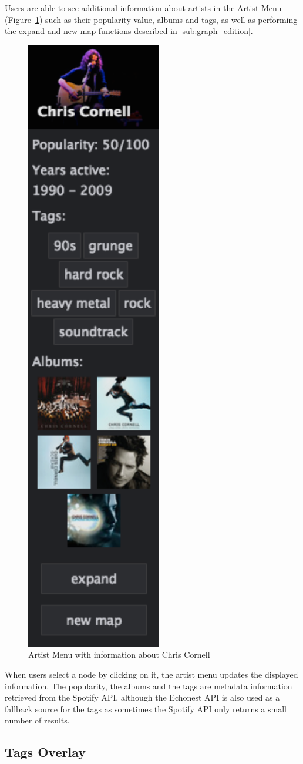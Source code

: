 \documentclass{article}
\begin{document}
      Users are able to see additional information about artists in the Artist Menu (Figure~\ref{fig:artist_menu}) such as their popularity value, albums and tags, as well as performing the expand and new map functions described in \ref{sub:graph_edition}.
      \begin{figure}[hb]
        \begin{center}
          \includegraphics[width=0.2\columnwidth]{../report/figures/artist_menu.pdf}
        \end{center}
        \caption{Artist Menu with information about Chris Cornell}
        \label{fig:artist_menu}
      \end{figure}
      When users select a node by clicking on it, the artist menu updates the displayed information.
      The popularity, the albums and the tags are metadata information retrieved from the Spotify API, although the Echonest API is also used as a fallback source for the tags  as sometimes the Spotify API only returns a small number of results.

    \subsection{Tags Overlay}
    \label{sub:tags_overlay}
    
\end{document}

